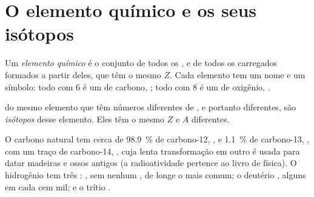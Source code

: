 \section{O elemento químico e os seus isótopos}

\begin{definition}\label{def:g9:inside-the-atom:element}
Um \emph{elemento químico} é o conjunto de todos
os , e de todos os  carregados formados a partir deles, que
têm o mesmo  $Z$. Cada elemento tem um nome e um símbolo:
todo  com 6  é um  de carbono, ; todo  com 8
 é um  de oxigênio, .
\end{definition}

\begin{definition}[Isótopos]\label{def:g9:inside-the-atom:isotope}
 do mesmo elemento que têm números diferentes de , e
portanto  diferentes, são \emph{isótopos}
desse elemento. Eles têm o mesmo $Z$ e $A$ diferentes.
\end{definition}

\begin{example}\label{ex:g9:inside-the-atom:isotopes}
O carbono natural tem cerca de \qty{98.9}{\percent} de carbono-12,
, e \qty{1.1}{\percent} de carbono-13, ,
com um traço de carbono-14, , cuja lenta transformação
em outro  é usada para datar madeiras e ossos antigos (a
radioatividade pertence ao livro de física). O hidrogênio tem três
: , sem nenhum , de longe o mais comum; o
deutério , alguns  em cada cem mil; e o trítio
.
\end{example}

